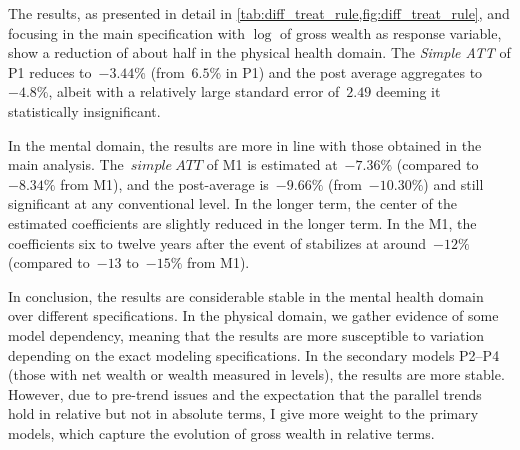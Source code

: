 The results, as presented in detail in \cref{tab:diff_treat_rule,fig:diff_treat_rule}, and focusing in the main specification with $\log$ of gross wealth as response variable, show a reduction of about half in the physical health domain. 
The \textit{Simple ATT} of P1 reduces to~$-3.44\%$ (from~$6.5\%$ in P1) and the post average aggregates to~$-4.8\%$, albeit with a relatively large standard error of~$2.49$ deeming it statistically insignificant.

In the mental domain, the results are more in line with those obtained in the main analysis. 
The~$simple~ATT$ of M1 is estimated at~$−7.36\%$ (compared to~$−8.34\%$ from M1), and the post-average is~$-9.66\%$ (from~$-10.30\%$) and still significant at any conventional level. 
In the longer term, the center of the estimated coefficients are slightly reduced in the longer term. 
In the M1, the coefficients six to twelve years after the event of stabilizes at around~$-12\%$ (compared to~$-13$ to~$-15\%$ from M1).

In conclusion, the results are considerable stable in the mental health domain over different specifications. 
In the physical domain, we gather evidence of some model dependency, meaning that the results are more susceptible to variation depending on the exact modeling specifications. 
In the secondary models P2--P4 (those with net wealth or wealth measured in levels), the results are more stable. 
However, due to pre-trend issues and the expectation that the parallel trends hold in relative but not in absolute terms, I give more weight to the primary models, which capture the evolution of gross wealth in relative terms.

